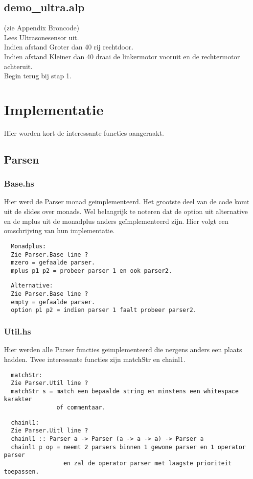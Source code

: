 \documentclass[a4paper,10pt]{article}
\begin{document}
\subsection{demo\_ultra.alp}
 (zie Appendix Broncode)\\
  Lees Ultrasonesensor uit.\\
  Indien afstand Groter dan 40 rij rechtdoor.\\
  Indien afstand Kleiner dan 40 draai de linkermotor vooruit en de rechtermotor achteruit.\\
  Begin terug bij stap 1.

\section{Implementatie}

  Hier worden kort de interessante functies aangeraakt.
  \subsection{Parsen}
  \subsubsection{Base.hs}
  Hier werd de Parser monad geimplementeerd. Het grootste deel van de code komt uit de slides over monads.
  Wel belangrijk te noteren dat de option uit alternative en de mplus uit de monadplus anders geïmplementeerd zijn.
  Hier volgt een omschrijving van hun implementatie.

  \begin{verbatim}
  Monadplus:
  Zie Parser.Base line ?
  mzero = gefaalde parser.
  mplus p1 p2 = probeer parser 1 en ook parser2.
  \end{verbatim}

  \begin{verbatim}
  Alternative:
  Zie Parser.Base line ?
  empty = gefaalde parser.
  option p1 p2 = indien parser 1 faalt probeer parser2.
  \end{verbatim}
  \subsubsection{Util.hs}
  Hier werden alle Parser functies geimplementeerd die nergens anders een plaats hadden.
  Twee interessante functies zijn matchStr en chainl1.
  \begin{verbatim}
  matchStr:
  Zie Parser.Util line ?
  matchStr s = match een bepaalde string en minstens een whitespace karakter 
               of commentaar.
  \end{verbatim}
  \begin{verbatim}
  chainl1:
  Zie Parser.Uitl line ?
  chainl1 :: Parser a -> Parser (a -> a -> a) -> Parser a
  chainl1 p op = neemt 2 parsers binnen 1 gewone parser en 1 operator parser 
                 en zal de operator parser met laagste prioriteit toepassen.
  \end{verbatim}
\end{document}
